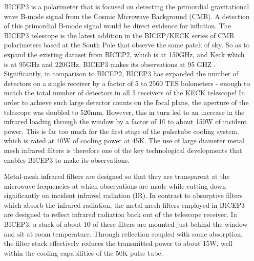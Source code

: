 \documentclass[12pt]{article}
\begin{document}
BICEP3 is a polarimeter that is focused on detecting the primordial gravitational wave B-mode signal from the Cosmic Microwave Background (CMB). A detection of this primordial B-mode signal would be direct evidence for inflation. The BICEP3 telescope is the latest addition in the BICEP/KECK series of CMB polarimeters based at the South Pole that observe the same patch of sky. So as to expand the existing dataset from BICEP2, which is at 150GHz, and Keck which is at 95GHz and 220GHz, BICEP3 makes its observations at 95 GHZ . Significantly, in comparison to BICEP2, BICEP3 has expanded the number of detectors on a single receiver by a factor of 5 to 2560 TES bolometers - enough to match the total number of detectors in all 5 receivers of the KECK telescope! In order to achieve such large detector counts on the focal plane, the aperture of the telescope was doubled to 520mm. However, this in turn led to an increase in the infrared loading through the window by a factor of 10 to about 150W of incident power. This is far too much for the first stage of the pulsetube cooling system, which is rated at 40W of cooling power at 45K. The use of large diameter metal mesh infrared filters is therefore one of the key technological developments that enables BICEP3 to make its observations.

Metal-mesh infrared filters are designed so that they are transparent at the microwave frequencies at which observations are made while cutting down significantly on incident infrared radiation (IR). In contrast to absorptive filters which absorb the infrared radiation, the metal mesh filters employed in BICEP3 are designed to reflect infrared radiation back out of the telescope receiver. In BICEP3, a stack of about 10 of these filters are mounted just behind the window and sit at room temperature. Through reflection coupled with some absorption, the filter stack effectively reduces the transmitted power to about 15W, well within the cooling capabilities of the 50K pulse tube. 
\end{document}
